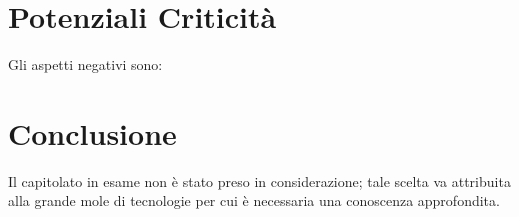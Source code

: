 \section{Potenziali Criticità}
Gli aspetti negativi sono:
\section{Conclusione}
Il capitolato in esame non è stato preso in considerazione; tale scelta va attribuita alla grande mole di tecnologie per cui è necessaria una conoscenza approfondita.